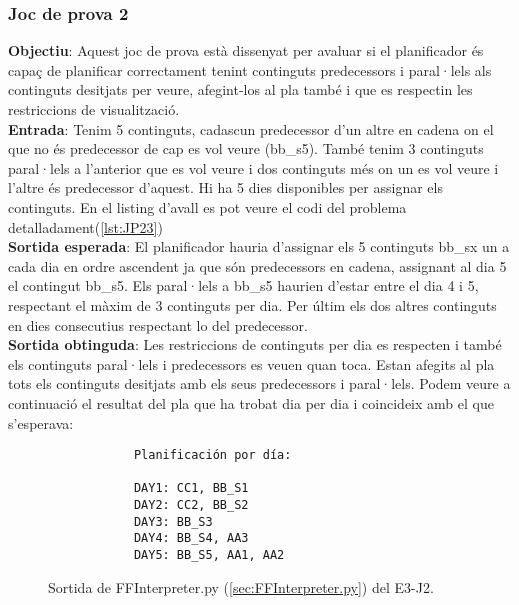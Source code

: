 \documentclass[a4paper]{article}
\begin{document}
	
	\subsubsection*{Joc de prova 2}
	
	\noindent \textbf{Objectiu}: Aquest joc de prova està dissenyat per avaluar si el planificador és capaç de planificar correctament tenint continguts predecessors i paral·lels als continguts desitjats per veure, afegint-los al pla també i que es respectin les restriccions de visualització. \\
	
	\noindent \textbf{Entrada}: Tenim 5 continguts, cadascun predecessor d'un altre en cadena on el que no és predecessor de cap es vol veure (bb\_s5). També tenim 3 continguts paral·lels a l'anterior que es vol veure i dos continguts més on un es vol veure i l'altre és predecessor d'aquest. Hi ha 5 dies disponibles per assignar els continguts. En el listing d'avall es pot veure el codi del problema detalladament(\ref{lst:JP23})\\
	
	\noindent \textbf{Sortida esperada}: El planificador hauria d'assignar els 5 continguts bb\_sx un a cada dia en ordre ascendent ja que són predecessors en cadena, assignant al dia 5 el contingut bb\_s5. Els paral·lels a bb\_s5 haurien d'estar entre el dia 4 i 5, respectant el màxim de 3 continguts per dia. Per últim els dos altres continguts en dies consecutius respectant lo del predecessor.\\
	
	\noindent \textbf{Sortida obtinguda}: Les restriccions de continguts per dia es respecten i també els continguts paral·lels i predecessors es veuen quan toca. Estan afegits al pla tots els continguts desitjats amb els seus predecessors i paral·lels. Podem veure a continuació el resultat del pla que ha trobat dia per dia i coincideix amb el que s'esperava:
	
	\begin{figure}[H]
		\centering
		\begin{verbatim}
			Planificación por día:
			
			DAY1: CC1, BB_S1
			DAY2: CC2, BB_S2
			DAY3: BB_S3
			DAY4: BB_S4, AA3
			DAY5: BB_S5, AA1, AA2
		\end{verbatim}
		\caption{Sortida de FFInterpreter.py (\ref{sec:FFInterpreter.py}) del E3-J2.}
	\end{figure}
	
\end{document}
